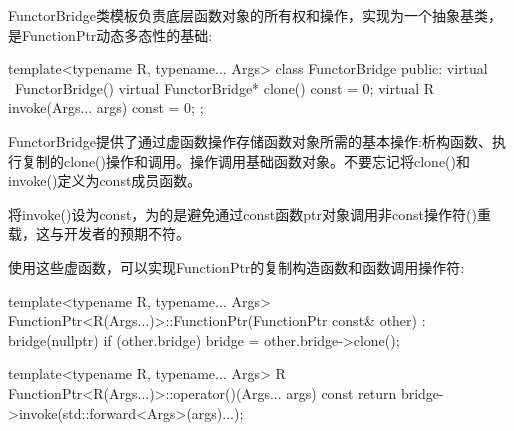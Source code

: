 FunctorBridge类模板负责底层函数对象的所有权和操作，实现为一个抽象基类，是FunctionPtr动态多态性的基础:

\begin{cpp}
template<typename R, typename... Args>
class FunctorBridge
{
	public:
	virtual ~FunctorBridge() {
	}
	virtual FunctorBridge* clone() const = 0;
	virtual R invoke(Args... args) const = 0;
};
\end{cpp}

FunctorBridge提供了通过虚函数操作存储函数对象所需的基本操作:析构函数、执行复制的clone()操作和调用。操作调用基础函数对象。不要忘记将clone()和invoke()定义为const成员函数。

\begin{notice}将invoke()设为const，为的是避免通过const函数ptr对象调用非const操作符()重载，这与开发者的预期不符。
\end{notice}

使用这些虚函数，可以实现FunctionPtr的复制构造函数和函数调用操作符:

\begin{cpp}
template<typename R, typename... Args>
FunctionPtr<R(Args...)>::FunctionPtr(FunctionPtr const& other)
: bridge(nullptr)
{
	if (other.bridge) {
		bridge = other.bridge->clone();
	}
}

template<typename R, typename... Args>
R FunctionPtr<R(Args...)>::operator()(Args... args) const
{
	return bridge->invoke(std::forward<Args>(args)...);
}
\end{cpp}














































